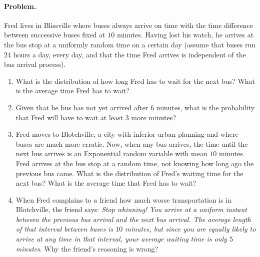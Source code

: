 \documentclass[12pt]{article}
\begin{document}
\paragraph{Problem.}
Fred lives in Blissville where buses always arrive on time with the time difference
between successive buses fixed at $10$ minutes.
Having lost his watch, he arrives at the bus stop at a uniformly random time on a certain day
(assume that buses run $24$ hours a day, every day, and that the time Fred arrives is 
independent of the bus arrival process).

\begin{enumerate}
\item What is the distribution of how long Fred has to wait for the next bus?
What is the average time Fred has to wait?

\item Given that he bus has not yet arrived after $6$ minutes, what is the probability 
that Fred will have to wait at least $3$ more minutes?

\item Fred moves to Blotchville, a city with inferior urban planning and where buses
are much more erratic. Now, when any bus arrives, the time until the next bus arrives is an Exponential
random variable with mean $10$ minutes.
Fred arrives at the bus stop at a random time, not knowing how long ago the previous bus came.
What is the distribution of Fred's waiting time for the next bus? What is the average time 
that Fred has to wait?

\item When Fred complains to a friend how much worse transportation is in Blotchville, the friend
says: \textit{Stop whinning! You arrive at a uniform instant between the previous bus arrival and 
the next bus arrival. The average length of that interval between buses is $10$ minutes, but
since you are equally likely to arrive at any time in that interval, your average waiting time is 
only $5$ minutes}. Why the friend's reasoning is wrong?
\end{enumerate}
\end{document}
